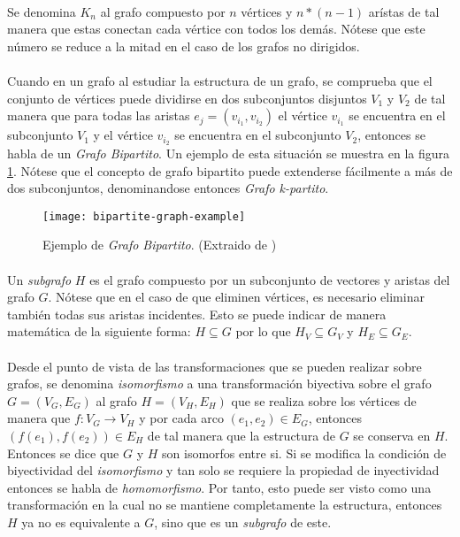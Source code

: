 \documentclass{subfiles}
\begin{document}
      \paragraph{}
      Se denomina $K_n$ al grafo compuesto por $n$ vértices y $n*(n-1)$ arístas de tal manera que estas conectan cada vértice con todos los demás. Nótese que este número se reduce a la mitad en el caso de los grafos no dirigidos.

      \paragraph{}
      Cuando en un grafo al estudiar la estructura de un grafo, se comprueba que el conjunto de vértices puede dividirse en dos subconjuntos disjuntos $V_1$ y $V_2$ de tal manera que para todas las aristas $e_j = (v_{i_1}, v_{i_2})$ el vértice $v_{i_1}$ se encuentra en el subconjunto $V_1$ y el vértice $v_{i_2}$ se encuentra en el subconjunto $V_2$, entonces se habla de un \emph{Grafo Bipartito}. Un ejemplo de esta situación se muestra en la figura \ref{img:bipartite_graph_example}. Nótese que el concepto de grafo bipartito puede extenderse fácilmente a más de dos subconjuntos, denominandose entonces \emph{Grafo k-partito}.

      \begin{figure}
        \centering
        \texttt{[image: bipartite-graph-example]}
        \caption{Ejemplo de \emph{Grafo Bipartito}. (Extraido de \cite{wiki:Graph_(discrete_mathematics)})}
        \label{img:bipartite_graph_example}
      \end{figure}

      \paragraph{}
      Un \emph{subgrafo} $H$ es el grafo compuesto por un subconjunto de vectores y aristas del grafo $G$. Nótese que en el caso de que eliminen vértices, es necesario eliminar también todas sus aristas incidentes. Esto se puede indicar de manera matemática de la siguiente forma: $H \subseteq G$ por lo que $H_V \subseteq G_V$ y $H_E \subseteq G_E$.

      \paragraph{}
      Desde el punto de vista de las transformaciones que se pueden realizar sobre grafos, se denomina \emph{isomorfismo} a una transformación biyectiva sobre el grafo $G =(V_G, E_G)$ al grafo $H = (V_H, E_H)$ que se realiza sobre los vértices de manera que $f: V_G \rightarrow V_H$ y por cada arco $(e_1, e_2) \in E_G$, entonces $(f(e_1), f(e_2)) \in E_H$ de tal manera que la estructura de $G$ se conserva en $H$. Entonces se dice que $G$ y $H$ son isomorfos entre si. Si se modifica la condición de biyectividad del \emph{isomorfismo} y tan solo se requiere la propiedad de inyectividad entonces se habla de \emph{homomorfismo}. Por tanto, esto puede ser visto como una transformación en la cual no se mantiene completamente la estructura, entonces $H$ ya no es equivalente a $G$, sino que es un \emph{subgrafo} de este.
\end{document}
